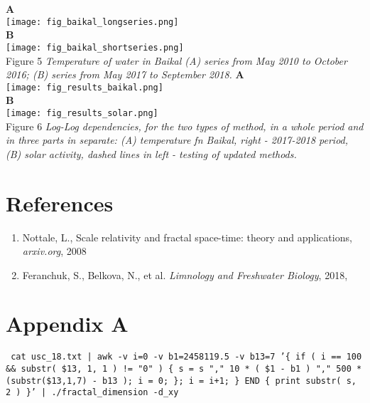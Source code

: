 \documentclass[a4paper]{article}
\begin{document}
\newpage
{\large{\textbf{A}}}\\
\texttt{[image: fig\_baikal\_longseries.png]}\\
\vskip 12pt
{\large{\textbf{B}}}\\
\texttt{[image: fig\_baikal\_shortseries.png]}\\
\vskip 12pt
Figure 5 \textit{Temperature of water in Baikal (A) series from May 2010 to October 2016; (B) series from May 2017 to September 2018. }
\vskip 12pt
{\large{\textbf{A}}}\\
\texttt{[image: fig\_results\_baikal.png]}\\
\vskip 6pt
{\large{\textbf{B}}}\\
\texttt{[image: fig\_results\_solar.png]}\\
\vskip 6pt
Figure 6 \textit{Log-Log dependencies, for the two types of method, in a whole period and in three parts in separate: (A) temperature fn Baikal, right -  2017-2018 period, (B) solar activity, dashed lines in left - testing of updated methods. }

\section*{References}

\begin{enumerate}

\item Nottale, L., Scale relativity and fractal space-time: theory and applications, \textit{arxiv.org}, 2008

\item Feranchuk, S., Belkova, N., et al. \textit{Limnology and Freshwater Biology}, 2018,

\end{enumerate}

\newpage
\section*{Appendix A}


\texttt{\small{ cat usc\_18.txt | awk -v i=0 -v b1=2458119.5 -v b13=7 '\{ if ( i == 100 \&\& substr( \$13, 1, 1 ) != "0" ) \{ s = s "," 10 * ( \$1 - b1 ) "," 500 * (substr(\$13,1,7) - b13 ); i = 0; \}; i = i+1; \} END \{ print substr( s, 2 ) \}' | ./fractal\_dimension -d\_xy }}


\end{document}

